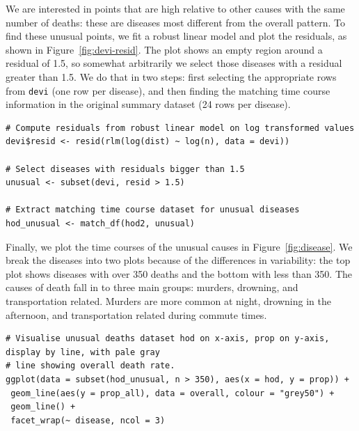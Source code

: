 \documentclass[article]{jss}
\begin{document}
We are interested in points that are high relative to other causes with the same number of deaths: these are diseases most different from the overall pattern. To find these unusual points, we fit a robust linear model and plot the residuals, as shown in Figure~\ref{fig:devi-resid}. The plot shows an empty region around a residual of 1.5, so somewhat arbitrarily we select those diseases with a residual greater than 1.5. We do that in two steps: first selecting the appropriate rows from {\tt devi} (one row per disease), and then finding the matching time course information in the original summary dataset (24 rows per disease).

\begin{verbatim}
# Compute residuals from robust linear model on log transformed values
devi$resid <- resid(rlm(log(dist) ~ log(n), data = devi))

# Select diseases with residuals bigger than 1.5
unusual <- subset(devi, resid > 1.5)

# Extract matching time course dataset for unusual diseases
hod_unusual <- match_df(hod2, unusual)
\end{verbatim}

Finally, we plot the time courses of the unusual causes in Figure~\ref{fig:disease}. We break the diseases into two plots because of the differences in variability: the top plot shows diseases with over 350 deaths and the bottom with less than 350. The causes of death fall in to three main groups: murders, drowning, and transportation related. Murders are more common at night, drowning in the afternoon, and transportation related during commute times.

\begin{verbatim}
# Visualise unusual deaths dataset hod on x-axis, prop on y-axis, display by line, with pale gray
# line showing overall death rate.
ggplot(data = subset(hod_unusual, n > 350), aes(x = hod, y = prop)) + 
 geom_line(aes(y = prop_all), data = overall, colour = "grey50") +
 geom_line() + 
 facet_wrap(~ disease, ncol = 3)
\end{verbatim}
\end{document}
